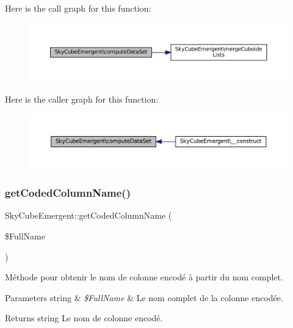 Here is the call graph for this function\+:\nopagebreak
\begin{figure}[H]
\begin{center}
\leavevmode
\includegraphics[width=350pt]{class_sky_cube_emergent_acc1b45049447db94232a71cdf396336e_cgraph}
\end{center}
\end{figure}
Here is the caller graph for this function\+:\nopagebreak
\begin{figure}[H]
\begin{center}
\leavevmode
\includegraphics[width=350pt]{class_sky_cube_emergent_acc1b45049447db94232a71cdf396336e_icgraph}
\end{center}
\end{figure}
\mbox{\label{class_sky_cube_emergent_a59f1edc639c052706138c5dbf5c13bf7}} 
\subsubsection{\texorpdfstring{get\+Coded\+Column\+Name()}{getCodedColumnName()}}
{\footnotesize\ttfamily Sky\+Cube\+Emergent\+::get\+Coded\+Column\+Name (\begin{DoxyParamCaption}\item[{}]{\$\+Full\+Name }\end{DoxyParamCaption})}

Méthode pour obtenir le nom de colonne encodé à partir du nom complet.


\begin{DoxyParams}[1]{Parameters}
string & {\em \$\+Full\+Name} & Le nom complet de la colonne encodée. \\
\hline
\end{DoxyParams}
\begin{DoxyReturn}{Returns}
string Le nom de colonne encodé. 
\end{DoxyReturn}



